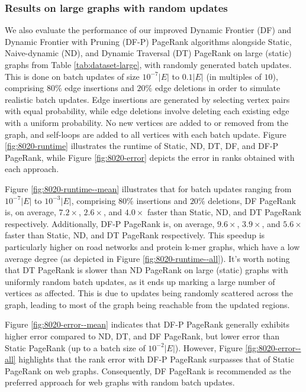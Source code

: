 


\subsubsection{Results on large graphs with random updates}

We also evaluate the performance of our improved Dynamic Frontier (DF) and Dynamic Frontier with Pruning (DF-P) PageRank algorithms alongside Static, Naive-dynamic (ND), and Dynamic Traversal (DT) PageRank on large (static) graphs from Table \ref{tab:dataset-large}, with randomly generated batch updates. This is done on batch updates of size $10^{-7}|E|$ to $0.1|E|$ (in multiples of $10$), comprising $80\%$ edge insertions and $20\%$ edge deletions in order to simulate realistic batch updates. Edge insertions are generated by selecting vertex pairs with equal probability, while edge deletions involve deleting each existing edge with a uniform probability. No new vertices are added to or removed from the graph, and self-loops are added to all vertices with each batch update. Figure \ref{fig:8020-runtime} illustrates the runtime of Static, ND, DT, DF, and DF-P PageRank, while Figure \ref{fig:8020-error} depicts the error in ranks obtained with each approach.




Figure \ref{fig:8020-runtime--mean} illustrates that for batch updates ranging from $10^{-7}|E|$ to $10^{-3}|E|$, comprising $80\%$ insertions and $20\%$ deletions, DF PageRank is, on average, $7.2\times$, $2.6\times$, and $4.0\times$ faster than Static, ND, and DT PageRank respectively. Additionally, DF-P PageRank is, on average, $9.6\times$, $3.9\times$, and $5.6\times$ faster than Static, ND, and DT PageRank respectively. This speedup is particularly higher on road networks and protein k-mer graphs, which have a low average degree (as depicted in Figure \ref{fig:8020-runtime--all}). It's worth noting that DT PageRank is slower than ND PageRank \cite{sahu2024incrementally} on large (static) graphs with uniformly random batch updates, as it ends up marking a large number of vertices as affected. This is due to updates being randomly scattered across the graph, leading to most of the graph being reachable from the updated regions.

Figure \ref{fig:8020-error--mean} indicates that DF-P PageRank generally exhibits higher error compared to ND, DT, and DF PageRank, but lower error than Static PageRank (up to a batch size of $10^{-2}|E|$). However, Figure \ref{fig:8020-error--all} highlights that the rank error with DF-P PageRank surpasses that of Static PageRank on web graphs. Consequently, DF PageRank is recommended as the preferred approach for web graphs with random batch updates.


